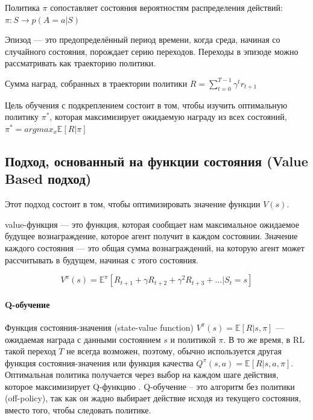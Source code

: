 Политика $\pi$ сопоставляет состояния вероятностям распределения действий: $\pi : S \to p(A = a|S)$

Эпизод --- это предопределённый период времени, когда среда, начиная со случайного состояния, порождает серию переходов. Переходы в эпизоде можно рассматривать как траекторию политики.

Сумма наград, собранных в траектории политики $R = \sum_{t=0}^{T-1} \gamma^t r_{t+1}$

Цель обучения с подкреплением состоит в том, чтобы изучить оптимальную политику ${\pi^*}$, которая максимизирует ожидаемую награду из всех состояний, $\pi^* = argmax_x \mathbb{E} [R|\pi]$ \cite{Otterlo2012ReinforcementLA}

\subsection{Подход, основанный на функции состояния (Value Based подход)}

Этот подход состоит в том, чтобы оптимизировать значение функции $V(s)$.

value-функция — это функция, которая сообщает нам максимальное ожидаемое будущее вознаграждение, которое агент получит в каждом состоянии. Значение каждого состояния — это общая сумма вознаграждений, на которую агент может рассчитывать в будущем, начиная с этого состояния.

\begin{equation} \label{eq:someEq}
V^\pi (s) = \mathbb{E}^\pi [R_{t+1} + \gamma R_{t+2} + \gamma^2 R_{t+3} + ... |S_t = s]
\end{equation}

\paragraph{Q-обучение}

Функция состояния-значения (state-value function) $V^\pi (s) = \mathbb{E}[R|s, \pi]$ --- ожидаемая награда с данными состоянием $s$ и политикой $\pi$. В то же время, в RL такой переход $T$ не всегда возможен, поэтому, обычно используется другая функция состояния-значения или функция качества $Q^\pi(s,a) = \mathbb{E}[R|s, a, \pi]$. Оптимальная политика получается через выбор на каждом шаге действия, которое максимизирует Q-функцию \cite{SuttonAndBarto-RL-Introduction-p107}. Q-обучение -- это алгоритм без политики (off-policy), так как он жадно выбирает действие исходя из текущего состояния, вместо того, чтобы следовать политике.


